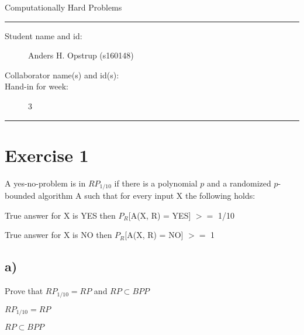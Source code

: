 \documentclass[11pt]{article}
\begin{document}
\begin{center}
{{\Large \sc Computationally Hard Problems}}
\end{center}
\rule{\textwidth}{1pt}
\begin{description}
\item[Student name and id:] Anders H. Opstrup (s160148)
\item[Collaborator name(s) and id(s):]
\item[Hand-in for week:] 3
\end{description}
\rule{\textwidth}{1pt}

\section*{Exercise 1}
A yes-no-problem is in $RP_{1/10}$ if there is a polynomial $p$ and a randomized $p$-bounded algorithm A such that for every input X the following holds: \newline

True answer for X is YES then $P_{R}$[A(X, R) = YES] $>=$ 1/10

True answer for X is NO then  $P_{R}$[A(X, R) = NO] $>=$ 1

\subsection*{a)}
Prove that $RP_{1/10} = RP$ and $RP\subset BPP$

$RP_{1/10} = RP$

$RP\subset BPP$
\end{document}
